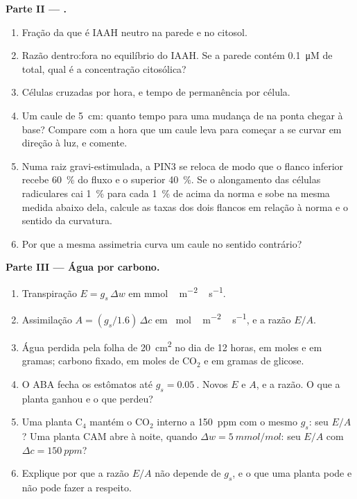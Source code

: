 \begin{problem}
\medskip
\noindent\textbf{Parte II --- .}
\begin{enumerate}[resume]
  \item Fração da  que é IAAH neutro na parede e no citosol.
  \item Razão dentro:fora no equilíbrio do IAAH. Se a parede contém
        \qty{0.1}{\micro M} de  total, qual é a concentração
        citosólica?
  \item Células cruzadas por hora, e tempo de permanência por célula.
  \item Um caule de \qty{5}{cm}: quanto tempo para uma mudança de 
        na ponta chegar à base? Compare com a hora que um caule leva para
        começar a se curvar em direção à luz, e comente.
  \item Numa raiz gravi-estimulada, a PIN3 se reloca de modo que o flanco
        inferior recebe \qty{60}{\%} do fluxo e o superior \qty{40}{\%}.
        Se o alongamento das células radiculares cai \qty{1}{\%} para
        cada \qty{1}{\%} de  acima da norma e sobe na mesma medida
        abaixo dela, calcule as taxas dos dois flancos em relação à norma
        e o sentido da curvatura.
  \item Por que a mesma assimetria curva um caule no sentido contrário?
\end{enumerate}

\medskip
\noindent\textbf{Parte III --- Água por carbono.}
\begin{enumerate}[resume]
  \item Transpiração $E = g_{s}\,\Delta w$ em \unit{mmol\,m^{-2}\,s^{-1}}.
  \item Assimilação $A = (g_{s}/1.6)\,\Delta c$ em \unit{\micro
        mol\,m^{-2}\,s^{-1}}, e a razão $E/A$.
  \item Água perdida pela folha de \qty{20}{cm^2} no dia de 12 horas, em
        moles e em gramas; carbono fixado, em moles de CO$_{2}$ e em
        gramas de glicose.
  \item O ABA fecha os estômatos até $g_{s} = \qty{0.05}{}$. Novos $E$ e
        $A$, e a razão. O que a planta ganhou e o que perdeu?
  \item Uma planta C$_{4}$ mantém o CO$_{2}$ interno a \qty{150}{ppm} com
        o mesmo $g_{s}$: seu $E/A$? Uma planta CAM abre à noite, quando
        $\Delta w = \qty{5}{mmol/mol}$: seu $E/A$ com $\Delta c =
        \qty{150}{ppm}$?
  \item Explique por que a razão $E/A$ não depende de $g_{s}$, e o que
        uma planta pode e não pode fazer a respeito.
\end{enumerate}


\end{problem}
